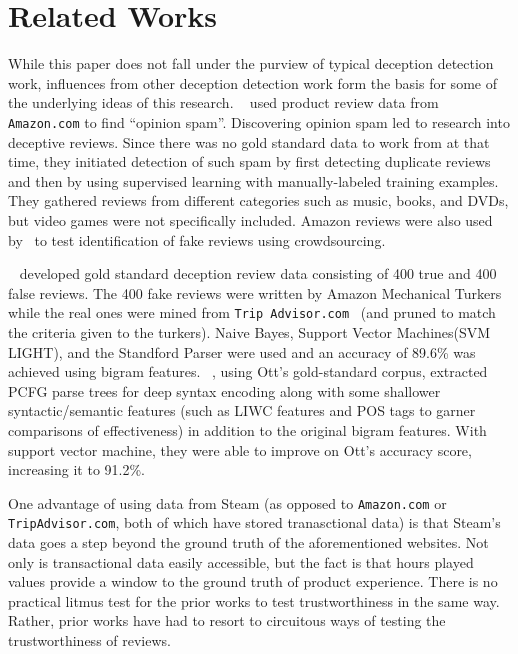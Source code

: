 \documentclass[9pt]{article}
\begin{document}


\section{Related Works}

While this paper does not fall under the purview of typical deception detection work, influences from other deception detection work form the basis for some of the underlying ideas of this research. ~\cite{Jindal:08} used product review data from {\tt Amazon.com} to find ``opinion spam''. Discovering opinion spam led to research into deceptive reviews. Since there was no gold standard data to work from at that time, they initiated detection of such spam by first detecting duplicate reviews and then by using supervised learning with manually-labeled training examples. They gathered reviews from different categories such as music, books, and DVDs, but video games were not specifically included. Amazon reviews were also used by~\cite{Forn:14} to test identification of fake reviews using crowdsourcing.

~\cite{Ott:11} developed gold standard deception review data consisting of 400 true and 400 false reviews. The 400 fake reviews were written by Amazon Mechanical Turkers while the real ones were mined from {\tt Trip Advisor.com } (and pruned to match the criteria given to the turkers). Naive Bayes, Support Vector Machines(SVM LIGHT), and the Standford Parser were used and an accuracy of 89.6\% was achieved using bigram features. ~\cite{Feng:12a}, using Ott's gold-standard corpus, extracted PCFG parse trees for deep syntax encoding along with some shallower syntactic/semantic features (such as LIWC features and POS tags to garner comparisons of effectiveness) in addition to the original bigram features. With support vector machine, they were able to improve on Ott's accuracy score, increasing it to 91.2\%.

One advantage of using data from Steam (as opposed to {\tt Amazon.com} or {\tt TripAdvisor.com}, both of which have stored tranasctional data) is that Steam's data goes a step beyond the ground truth of the aforementioned websites. Not only is transactional data easily accessible, but the fact is that hours played values provide a window to the ground truth of product experience. There is no practical litmus test for the prior works to test trustworthiness in the same way. Rather, prior works have had to resort to circuitous ways of testing the trustworthiness of reviews.
\end{document}
